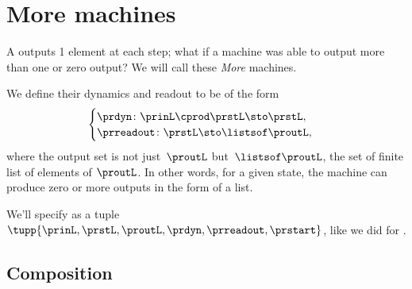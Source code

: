
\section{More machines}
\label{sec:more-machines}

A  outputs 1 element at each step; what if a machine was able to output more than one or zero output?
We will call these \emph{More} machines.

We define their dynamics and readout to be of the form
%
\begin{equation}
    \label{eq:more-signature}
    \begin{cases}
        \prdyn \colon  \prinL \cprod \prstL \sto \prstL, \\
        \prreadout \colon \prstL  \sto \listsof \proutL,
    \end{cases}
\end{equation}
%
where the output set is not just~$\proutL$ but~$\listsof \proutL$, the set of finite list of elements of $\proutL$.
In other words, for a given state, the machine can produce zero or more outputs in the form of a list.

We'll specify  as a tuple~$\tupp{\prinL,\prstL,\proutL,\prdyn,\prreadout,\prstart}$, like we did for .

\subsection{Composition}

